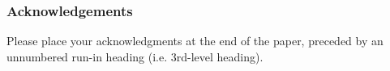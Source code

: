 \documentclass[runningheads]{llncs}
\begin{document}
\subsubsection{Acknowledgements} Please place your acknowledgments at
the end of the paper, preceded by an unnumbered run-in heading (i.e.
3rd-level heading).

%
%
%


%




\end{document}
